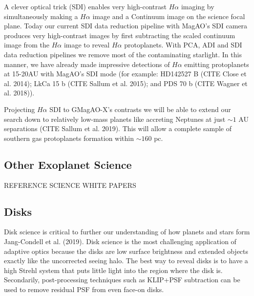 \documentclass[12pt,preprint]{aastex}
\begin{document}
A clever optical trick (SDI) enables very high-contrast $H\alpha$ imaging by simultaneously making a $H\alpha$ image and a Continuum image on the science focal plane. Today our current SDI data reduction pipeline with MagAO's SDI camera produces very high-contrast images by first subtracting the scaled continuum image from the $H\alpha$ image to reveal $H\alpha$ protoplanets. With PCA, ADI and SDI data reduction pipelines we remove most of the contaminating starlight. In this manner, we have already made impressive detections of $H\alpha$ emitting protoplanets at 15-20AU with MagAO's SDI mode (for example: HD142527 B (CITE Close et al. 2014); LkCa 15 b (CITE Sallum et al. 2015); and PDS 70 b (CITE Wagner et al. 2018)). 

Projecting $H\alpha$ SDI to  GMagAO-X's contrasts we will be able to extend our search down to relatively low-mass planets like accreting Neptunes at just $\sim1$ AU separations (CITE Sallum et al. 2019). This will allow a complete sample of southern gas protoplanets formation within $\sim160$ pc. 

%












\subsection{ Other Exoplanet Science}

REFERENCE SCIENCE WHITE PAPERS

\subsection{ Disks }
Disk science is critical to further our understanding of how planets and stars form Jang-Condell et al. (2019).
Disk science is the most challenging application of adaptive optics because
the disks are low surface brightness and extended objects exactly like the
uncorrected seeing halo. The best way to reveal disks is to have a high Strehl
system that puts little light into the region where the disk is. Secondarily,
post-processing techniques such as KLIP+PSF subtraction can be used to remove
residual PSF from even face-on disks.
\end{document}
